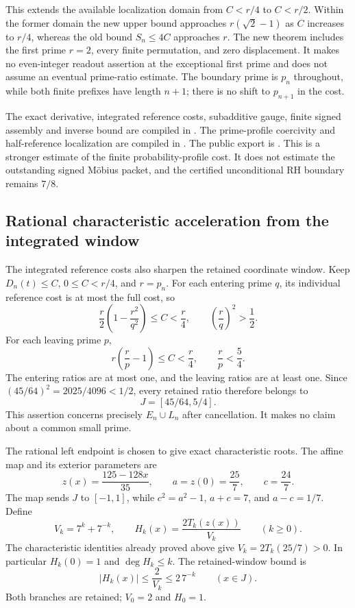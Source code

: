 \documentclass[11pt]{article}
\theoremstyle{definition}
\begin{document}
This extends the available localization domain from $C<r/4$ to
$C<r/2$. Within the former domain the new upper bound approaches
$r(\sqrt2-1)$ as $C$ increases to $r/4$, whereas the old bound
$S_n\le4C$ approaches $r$. The new theorem includes the first prime
$r=2$, every finite permutation, and zero displacement.
It makes no even-integer readout assertion at the exceptional first
prime and does not assume an eventual prime-ratio estimate.
The boundary prime is $p_n$ throughout, while both finite prefixes
have length $n+1$; there is no shift to $p_{n+1}$ in the cost.

\begin{flushleft}
The exact derivative, integrated reference costs, subadditive gauge,
finite signed assembly and inverse bound are compiled in
.
The prime-profile coercivity and half-reference localization are compiled in
.
The public export is
.
This is a stronger estimate of the finite probability-profile cost.
It does not estimate the outstanding signed M\"obius packet, and the
certified unconditional RH boundary remains $7/8$.
\end{flushleft}

\subsection{Rational characteristic acceleration from the integrated window}

The integrated reference costs also sharpen the retained coordinate
window. Keep $D_n(t)\le C$, $0\le C<r/4$, and $r=p_n$.
For each entering prime $q$, its individual reference cost is at most
the full cost, so
\[
 \frac r2\left(1-\frac{r^2}{q^2}\right)\le C<\frac r4,
 \qquad \left(\frac rq\right)^2>\frac12.
\]
For each leaving prime $p$,
\[
 r\left(\frac rp-1\right)\le C<\frac r4,\qquad \frac rp<\frac54.
\]
The entering ratios are at most one, and the leaving ratios are at
least one. Since $(45/64)^2=2025/4096<1/2$, every retained ratio
therefore belongs to
\[
 J=[45/64,5/4].
\]
This assertion concerns precisely $E_n\cup L_n$ after cancellation.
It makes no claim about a common small prime.

The rational left endpoint is chosen to give exact characteristic
roots. The affine map and its exterior parameters are
\[
 z(x)=\frac{125-128x}{35},\qquad
 a=z(0)=\frac{25}{7},\qquad c=\frac{24}{7}.
\]
The map sends $J$ to $[-1,1]$, while $c^2=a^2-1$,
$a+c=7$, and $a-c=1/7$. Define
\[
 V_k=7^k+7^{-k},\qquad
 H_k(x)=\frac{2T_k(z(x))}{V_k}\qquad(k\ge0).
\]
The characteristic identities already proved above give
$V_k=2T_k(25/7)>0$. In particular $H_k(0)=1$ and
$\deg H_k\le k$. The retained-window bound is
\[
 |H_k(x)|\le\frac2{V_k}\le2\,7^{-k}\qquad(x\in J).
\]
Both branches are retained; $V_0=2$ and $H_0=1$.
\end{document}
